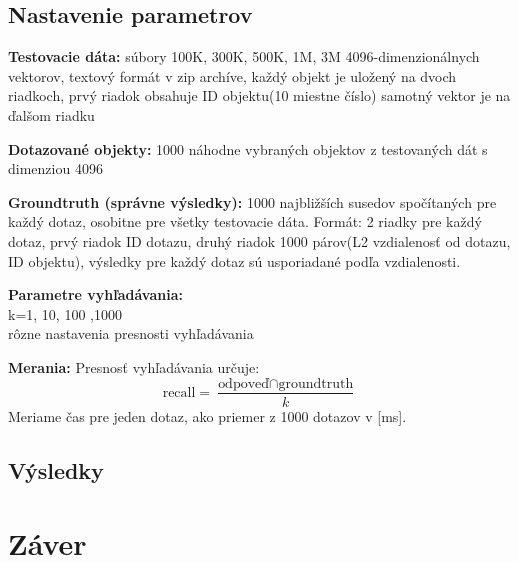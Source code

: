 \documentclass[12pt,a4paper,oneside]{fithesis2}
\begin{document}
\section{Nastavenie parametrov}
\begin{description}

\item \textbf{Testovacie dáta:} súbory 100K, 300K, 500K, 1M, 3M 4096-dimenzionálnych vektorov, textový formát v zip archíve, každý objekt je uložený na dvoch riadkoch, prvý riadok obsahuje ID objektu(10 miestne číslo) samotný vektor je na ďalšom riadku

\item \textbf{Dotazované objekty:} 1000 náhodne vybraných objektov z testovaných dát s dimenziou 4096

\item \textbf{Groundtruth (správne výsledky):} 1000 najbližších susedov spočítaných pre každý dotaz, osobitne pre všetky testovacie dáta. Formát: 2 riadky pre každý dotaz, prvý riadok ID dotazu, druhý riadok 1000 párov(L2 vzdialenosť od dotazu, ID objektu), výsledky pre každý dotaz sú usporiadané podľa vzdialenosti.

\item \textbf{Parametre vyhľadávania:} \\
k=1, 10, 100 ,1000 \\
rôzne nastavenia presnosti vyhľadávania \\

\item \textbf{Merania:}
Presnosť vyhľadávania určuje: 
\begin{equation*}
\textrm{recall} =  \frac{ \textrm{odpoveď} \cap \textrm{groundtruth}}{k}
\end{equation*}
Meriame čas pre jeden dotaz, ako priemer z 1000 dotazov v [ms].

\item 
\end{description}


\section{Výsledky}
    \chapter{Záver}
    

{}

\end{document}
